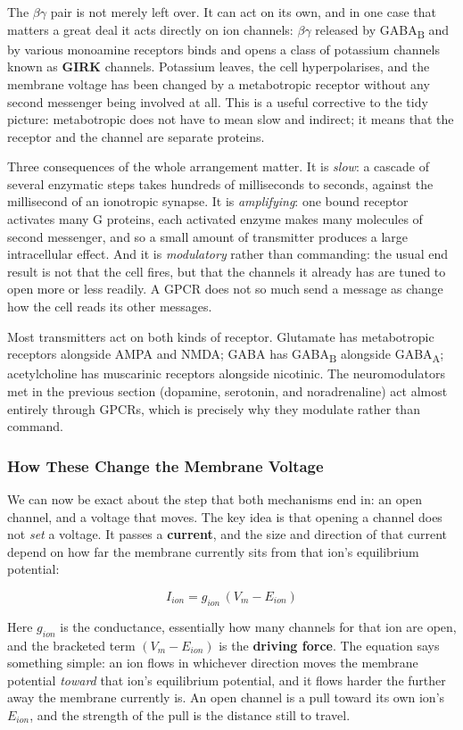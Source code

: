 \documentclass[11pt]{article}
\begin{document}
The $\beta\gamma$ pair is not merely left over. It can act on its own, and in one case that matters a great deal it acts directly on ion channels: $\beta\gamma$ released by GABA\textsubscript{B} and by various monoamine receptors binds and opens a class of potassium channels known as \textbf{GIRK} channels. Potassium leaves, the cell hyperpolarises, and the membrane voltage has been changed by a metabotropic receptor without any second messenger being involved at all. This is a useful corrective to the tidy picture: metabotropic does not have to mean slow and indirect; it means that the receptor and the channel are separate proteins.

Three consequences of the whole arrangement matter. It is \textit{slow}: a cascade of several enzymatic steps takes hundreds of milliseconds to seconds, against the millisecond of an ionotropic synapse. It is \textit{amplifying}: one bound receptor activates many G proteins, each activated enzyme makes many molecules of second messenger, and so a small amount of transmitter produces a large intracellular effect. And it is \textit{modulatory} rather than commanding: the usual end result is not that the cell fires, but that the channels it already has are tuned to open more or less readily. A GPCR does not so much send a message as change how the cell reads its other messages.

Most transmitters act on both kinds of receptor. Glutamate has metabotropic receptors alongside AMPA and NMDA; GABA has GABA\textsubscript{B} alongside GABA\textsubscript{A}; acetylcholine has muscarinic receptors alongside nicotinic. The neuromodulators met in the previous section (dopamine, serotonin, and noradrenaline) act almost entirely through GPCRs, which is precisely why they modulate rather than command.

\subsubsection{How These Change the Membrane Voltage}

We can now be exact about the step that both mechanisms end in: an open channel, and a voltage that moves. The key idea is that opening a channel does not \textit{set} a voltage. It passes a \textbf{current}, and the size and direction of that current depend on how far the membrane currently sits from that ion's equilibrium potential:

\[
I_{ion} = g_{ion}\,(V_m - E_{ion})
\]

Here $g_{ion}$ is the conductance, essentially how many channels for that ion are open, and the bracketed term $(V_m - E_{ion})$ is the \textbf{driving force}. The equation says something simple: an ion flows in whichever direction moves the membrane potential \textit{toward} that ion's equilibrium potential, and it flows harder the further away the membrane currently is. An open channel is a pull toward its own ion's $E_{ion}$, and the strength of the pull is the distance still to travel.
\end{document}
